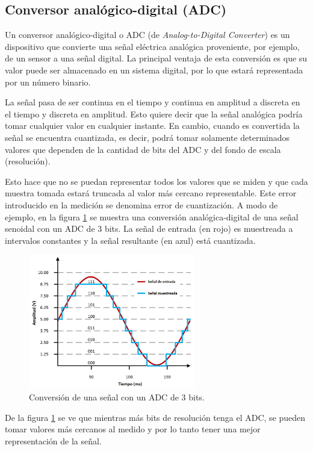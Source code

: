\subsection{Conversor analógico-digital (ADC)}

Un conversor analógico-digital o ADC (de \textit{Analog-to-Digital Converter}) es un dispositivo que convierte una señal eléctrica analógica proveniente, por ejemplo, de un sensor a una señal digital. La principal ventaja de esta conversión es que su valor puede ser almacenado en un sistema digital, por lo que estará representada por un número binario.

La señal pasa de ser continua en el tiempo y continua en amplitud a discreta en el tiempo y discreta en amplitud. Esto quiere decir que la señal analógica podría tomar cualquier valor en cualquier instante. En cambio, cuando es convertida la señal se encuentra cuantizada, es decir, podrá tomar solamente determinados valores que dependen de la cantidad de bits del ADC y del fondo de escala (resolución).

Esto hace que no se puedan representar todos los valores que se miden y que cada muestra tomada estará truncada al valor más cercano representable. Este error introducido en la medición se denomina error de cuantización. A modo de ejemplo, en la figura \ref{fig:muestreoADC} se muestra una conversión analógica-digital de una señal senoidal con un ADC de 3 bits. La señal de entrada (en rojo) es muestreada a intervalos constantes y la señal resultante (en azul) está cuantizada.

\begin{figure}[H]
\centering
\includegraphics[width=0.65\textwidth]{./Figures/muestreo.png}
\caption{Conversión de una señal con un ADC de 3 bits.}
\label{fig:muestreoADC}
\end{figure}

De la figura \ref{fig:muestreoADC} se ve que mientras más bits de resolución tenga el ADC, se pueden tomar valores más cercanos al medido y por lo tanto tener una mejor representación de la señal.

